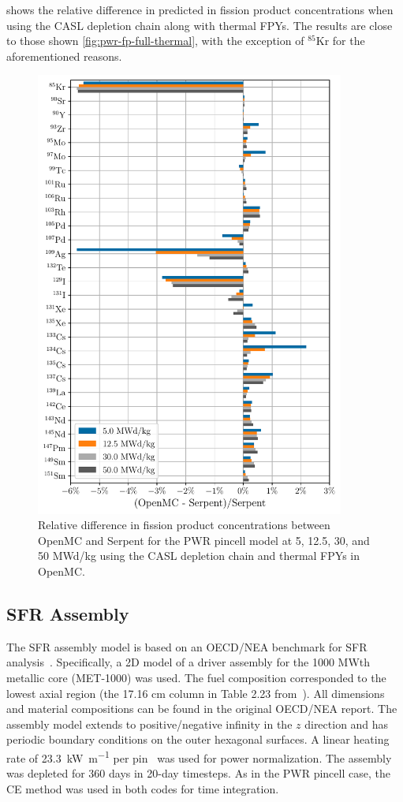 \documentclass[3p,authoryear]{elsarticle}
\begin{document}
 shows the relative difference in predicted in
fission product concentrations when using the CASL depletion chain along with
thermal FPYs. The results are close to those shown
\cref{fig:pwr-fp-full-thermal}, with the exception of $^{85}$Kr for the
aforementioned reasons.
\begin{figure}[H]
  \centering
  \includegraphics[width=4in]{figures/pwr_fp_casl_thermal.pdf}
  \caption{Relative difference in fission product concentrations between OpenMC
  and Serpent for the PWR pincell model at 5, 12.5, 30, and 50 MWd/kg using the
  CASL depletion chain and thermal FPYs in OpenMC.}
  \label{fig:pwr-fp-casl-thermal}
\end{figure}

\subsection{SFR Assembly}

The SFR assembly model is based on an OECD/NEA benchmark for SFR
analysis~\citep{nsc2015}. Specifically, a 2D model of a driver assembly for the
1000 MWth metallic core (MET-1000) was used. The fuel composition corresponded
to the lowest axial region (the 17.16 cm column in Table 2.23
from~\citep{nsc2015}). All dimensions and material compositions can be found in
the original OECD/NEA report. The assembly model extends to positive/negative
infinity in the $z$ direction and has periodic boundary conditions on the outer
hexagonal surfaces. A linear heating rate of \SI{23.3}{\kilo\watt\per\meter} per
pin~\citep{cahalan2007anl} was used for power normalization. The assembly was
depleted for 360 days in 20-day timesteps. As in the PWR pincell case, the CE
method was used in both codes for time integration.
\end{document}
